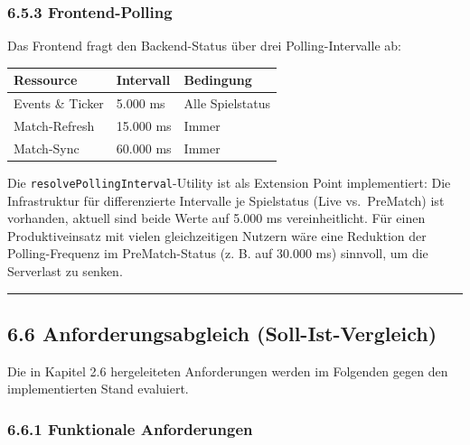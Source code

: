 \subsubsection{6.5.3 Frontend-Polling}\label{frontend-polling}

Das Frontend fragt den Backend-Status über drei Polling-Intervalle ab:

{\def\LTcaptype{none} %
\begin{longtable}[]{@{}lll@{}}
\toprule\noalign{}
Ressource & Intervall & Bedingung \\
\midrule\noalign{}
\endhead
\bottomrule\noalign{}
\endlastfoot
Events \& Ticker & 5.000 ms & Alle Spielstatus \\
Match-Refresh & 15.000 ms & Immer \\
Match-Sync & 60.000 ms & Immer \\
\end{longtable}
}

Die \passthrough{\lstinline!resolvePollingInterval!}-Utility ist als
Extension Point implementiert: Die Infrastruktur für differenzierte
Intervalle je Spielstatus (Live vs.~PreMatch) ist vorhanden, aktuell
sind beide Werte auf 5.000 ms vereinheitlicht. Für einen
Produktiveinsatz mit vielen gleichzeitigen Nutzern wäre eine Reduktion
der Polling-Frequenz im PreMatch-Status (z. B. auf 30.000 ms) sinnvoll,
um die Serverlast zu senken.

\begin{center}\rule{0.5\linewidth}{0.5pt}\end{center}

\subsection{6.6 Anforderungsabgleich
(Soll-Ist-Vergleich)}\label{anforderungsabgleich-soll-ist-vergleich}

Die in Kapitel 2.6 hergeleiteten Anforderungen werden im Folgenden gegen
den implementierten Stand evaluiert.

\subsubsection{6.6.1 Funktionale
Anforderungen}\label{funktionale-anforderungen}

